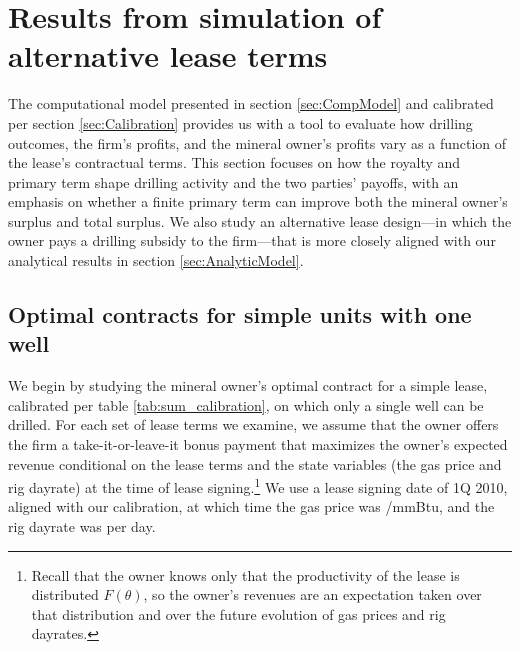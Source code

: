 \documentclass[12pt]{article}
\begin{document}
\section{Results from simulation of alternative lease terms \label{sec:Results}}

The computational model presented in section \ref{sec:CompModel} and calibrated per section \ref{sec:Calibration} provides us with a tool to evaluate how drilling outcomes, the firm's profits, and the mineral owner's profits vary as a function of the lease's contractual terms. This section focuses on how the royalty and primary term shape drilling activity and the two parties' payoffs, with an emphasis on whether a finite primary term can improve both the mineral owner's surplus and total surplus. We also study an alternative lease design---in which the owner pays a drilling subsidy to the firm---that is more closely aligned with our analytical results in section \ref{sec:AnalyticModel}.


\subsection{Optimal contracts for simple units with one well \label{sec:onewellopt}}

We begin by studying the mineral owner's optimal contract for a simple lease, calibrated per table \ref{tab:sum_calibration}, on which only a single well can be drilled. For each set of lease terms we examine, we assume that the owner offers the firm a take-it-or-leave-it bonus payment that maximizes the owner's expected revenue conditional on the lease terms and the state variables (the gas price and rig dayrate) at the time of lease signing.\footnote{Recall that the owner knows only that the productivity of the lease is distributed $F(\theta)$, so the owner's revenues are an expectation taken over that distribution and over the future evolution of gas prices and rig dayrates.} We use a lease signing date of 1Q 2010, aligned with our calibration, at which time the gas price was \unskip /mmBtu, and the rig dayrate was per day.
\end{document}
